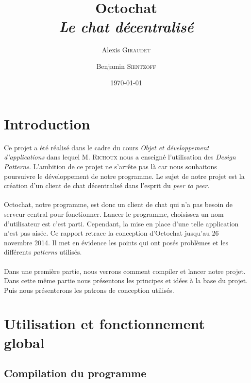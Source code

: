 \documentclass[a4paper]{article}
\title{Octochat \\ \textit{Le chat décentralisé}}
\author{Alexis \textsc{Giraudet} \and Benjamin \textsc{Sientzoff}}
\date{\today}
\begin{document}
	\maketitle
	\vspace{9cm}
	\tableofcontents
	\newpage %

	\section*{Introduction}
		\paragraph{}{
		Ce projet a été réalisé dans le cadre du cours \textit{Objet et développement d'applications}
		dans lequel M. \textsc{Richoux} nous a enseigné l'utilisation des \textit{Design Patterns}.
		L'ambition de ce projet ne s'arrête pas là car nous souhaitons poursuivre le développement de notre
		programme. Le sujet de notre projet est la création d'un client de chat décentralisé dans l'esprit du
		\textit{peer to peer}.
		}
		\paragraph{}{
		Octochat, notre programme, est donc un client de chat qui n'a pas besoin de serveur central pour fonctionner.
		Lancer le programme, choisissez un nom d'utilisateur est c'est parti. Cependant, la mise en place d'une telle
		application n'est pas aisée. Ce rapport retrace la conception d'Octochat jusqu'au 26 novembre 2014. Il met en
		évidence les points qui ont posés problèmes et les différents \textit{patterns} utilisés.
		}
		\paragraph{}{
		Dans une première partie, nous verrons comment compiler et lancer notre projet. Dans cette même
		partie nous présentons les principes et idées à la base du projet. Puis nous présenterons les patrons
		de conception utilisés.
		}

	\newpage

	\section{Utilisation et fonctionnement global}

		\subsection{Compilation du programme}
\end{document}
